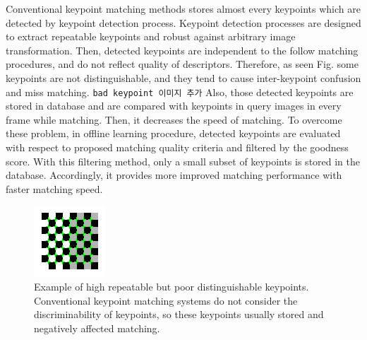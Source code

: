 Conventional keypoint matching methods stores almost every keypoints which are detected by keypoint detection process. Keypoint detection processes are designed to extract repeatable keypoints and robust against arbitrary image transformation. Then, detected keypoints are independent to the follow matching procedures, and do not reflect quality of descriptors. Therefore, as seen Fig.  some keypoints are not distinguishable, and they tend to cause inter-keypoint confusion and miss matching. \texttt{bad keypoint 이미지 추가} Also, those detected keypoints are stored in database and are compared with keypoints in query images in every frame while matching. Then, it decreases the speed of matching. To overcome these problem, in offline learning procedure, detected keypoints are evaluated with respect to proposed matching quality criteria and filtered by the goodness score. With this filtering method, only a small subset of keypoints is stored in the database. Accordingly, it provides more improved matching performance with faster matching speed.

\begin{figure}[ht!]
\centering
\includegraphics[width=0.5\columnwidth]{1_intro/checkerboard}
\caption{Example of high repeatable but poor distinguishable keypoints. Conventional keypoint matching systems do not consider the discriminability of keypoints, so these keypoints usually stored and negatively affected matching.}
\label{fig:example_of_bad_features}
\end{figure}

